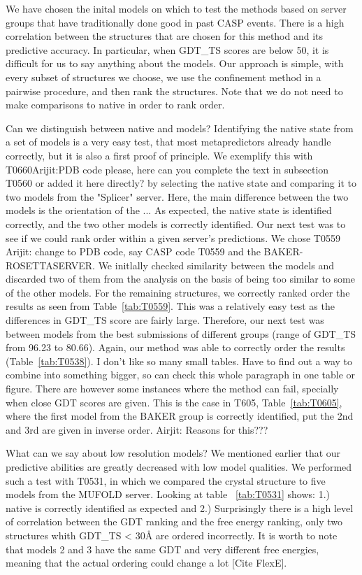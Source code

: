 \documentclass[12pt]{article}
\newcommand{\Alberto}[1]{\color{ForestGreen}#1\normalcolor }
\begin{document}
We have chosen the inital models on which to test the methods based on server groups that have
traditionally done good in past CASP events. There is a high correlation between the structures that
are chosen for this method and its predictive accuracy. In particular, when GDT\_TS scores are below
50, it is difficult for us to say anything about the models. Our approach is simple, with every
subset of structures we choose, we use the confinement method in a pairwise procedure, and then rank
the structures. Note that we do not need to make comparisons to native in order to rank order.

Can we distinguish between native and models? Identifying the native state from a set of models is a very easy test, that most metapredictors
already handle correctly, but it is also a first proof of principle. We exemplify this with
T0660\Alberto{Arijit:PDB code please, here can you complete the text in subsection T0560 or added it here
    directly?} by selecting the native state and comparing it to two models from the "Splicer"
server. Here, the main difference between the two models is the orientation of the ... As expected,
the native state is identified correctly, and the two other models is correctly identified. Our next test was to see if we could rank order within a given server's predictions. We chose
T0559 \Alberto{Arijit: change to PDB code, say CASP code T0559} and the BAKER-ROSETTASERVER. We
initlally checked similarity between the models and discarded two of them from the analysis on the
basis of being too similar to some of the other models. For the remaining structures, we correctly
ranked order the results as seen from Table~\protect\ref{tab:T0559}. This was a relatively easy test
as the differences in GDT\_TS score are fairly large. Therefore, our next test was between models
from the best submissions of different groups (range of GDT\_TS
from 96.23 to 80.66). Again, our method was able to correctly order the results
(Table~\protect\ref{tab:T0538}). \Alberto{I don't like so many small tables. Have to find out a way
    to combine into something bigger, so can check this whole paragraph in one table or figure.}
There are however some instances where the method can fail, specially when close GDT scores are
given. This is the case in T605, Table~\protect\ref{tab:T0605}, where the first model from the BAKER
group is correctly identified, put the 2nd and 3rd are given in inverse order. \Alberto{Airjit:
    Reasons for this???}

What can we say about low resolution models?
We mentioned earlier that our predictive abilities are greatly decreased with low model qualities.
We performed such a test with T0531, in which we compared the crystal structure to five models from
the MUFOLD server. Looking at table ~\protect\ref{tab:T0531} shows: 1.) native is correctly
identified as expected and 2.) Surprisingly there is a high level of correlation between the GDT
ranking and the free energy ranking, only two structures whith GDT\_TS < 30Å are ordered
incorrectly. It is worth to note that models 2 and 3 have the same GDT and very different free
energies, meaning that the actual ordering could change a lot [Cite FlexE].
\end{document}
